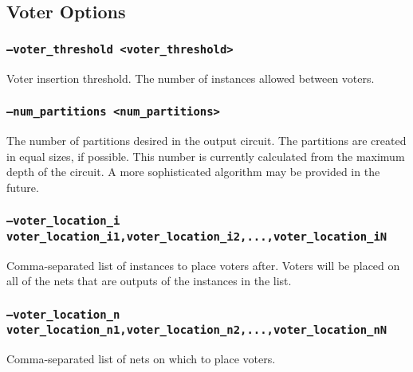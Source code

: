 
\subsection{Voter Options}

\subsubsection{\texttt{--voter\_threshold <voter\_threshold>}}
Voter insertion threshold. The number of instances allowed between voters.

\subsubsection{\texttt{--num\_partitions <num\_partitions>}}
The number of partitions desired in the output circuit. The partitions are
created in equal sizes, if possible. This number is currently calculated from
the maximum depth of the circuit. A more sophisticated algorithm may be
provided in the future.

\subsubsection{\texttt{--voter\_location\_i
voter\_location\_i1,voter\_location\_i2,...,voter\_location\_iN}}
Comma-separated list of instances to place voters after. Voters will be placed
on all of the nets that are outputs of the instances in the list.

\subsubsection{\texttt{--voter\_location\_n
voter\_location\_n1,voter\_location\_n2,...,voter\_location\_nN}}
Comma-separated list of nets on which to place voters.




